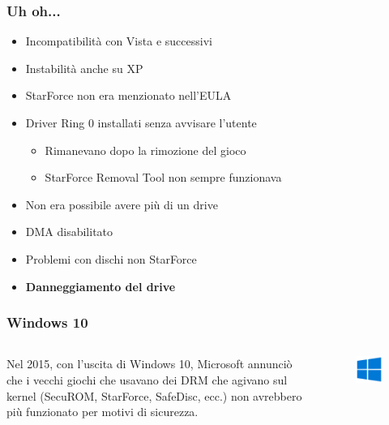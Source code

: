 \documentclass{beamer}
\begin{document}
	\begin{frame}
		\frametitle{Uh oh...}
		\begin{itemize}
			\item Incompatibilità con Vista e successivi
			\item Instabilità anche su XP
			\item StarForce non era menzionato nell'EULA
			\item Driver Ring 0 installati senza avvisare l'utente
			\begin{itemize}
				\item Rimanevano dopo la rimozione del gioco
				\item StarForce Removal Tool non sempre funzionava
			\end{itemize}
			\item Non era possibile avere più di un drive
			\item DMA disabilitato
			\item Problemi con dischi non StarForce
			\item \textbf{Danneggiamento del drive}
		\end{itemize}
	\end{frame}
	\begin{frame}
		\frametitle{Windows 10}
		\begin{columns}
			\begin{column}{0.6\textwidth}
				Nel 2015, con l'uscita di Windows 10, Microsoft annunciò che i vecchi giochi che usavano dei DRM che agivano sul kernel (SecuROM, StarForce, SafeDisc, ecc.) non avrebbero più funzionato per motivi di sicurezza.
			\end{column}
			\begin{column}{0.4\textwidth}
				\begin{figure}[h]
					\centering
					\includegraphics[width=1\textwidth]{imgs/win10logo.png}
				\end{figure}
			\end{column}
		\end{columns}	
	\end{frame}
\end{document}
